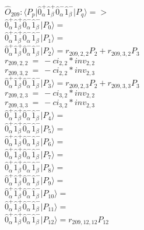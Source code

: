 \documentclass[14pt]{article}
\begin{document}
    $\hat{O}_{209}:  \langle{P_p}\vert \hat{0}_{\alpha}^{+}\hat{1}_{\beta}^{+}\hat{0}_{\alpha}^{-}\hat{1}_{\beta}^{-} \vert{P_q}\rangle => $ \\ 
    $ \hat{0}_{\alpha}^{+}\hat{1}_{\beta}^{+}\hat{0}_{\alpha}^{-}\hat{1}_{\beta}^{-} \vert{P_{0}}\rangle =  $ \\ 
    $ \hat{0}_{\alpha}^{+}\hat{1}_{\beta}^{+}\hat{0}_{\alpha}^{-}\hat{1}_{\beta}^{-} \vert{P_{1}}\rangle =  $ \\ 
    $ \hat{0}_{\alpha}^{+}\hat{1}_{\beta}^{+}\hat{0}_{\alpha}^{-}\hat{1}_{\beta}^{-} \vert{P_{2}}\rangle = {r}_{209,2,2}P_{2}+{r}_{209,3,2}P_{3} $ \\ 
    ${r}_{209,2,2}\ =\ -{ci}_{2,2}*{inv}_{2,2} $ \\ 
    ${r}_{209,3,2}\ =\ -{ci}_{2,2}*{inv}_{2,3} $ \\ 
    $ \hat{0}_{\alpha}^{+}\hat{1}_{\beta}^{+}\hat{0}_{\alpha}^{-}\hat{1}_{\beta}^{-} \vert{P_{3}}\rangle = {r}_{209,2,3}P_{2}+{r}_{209,3,3}P_{3} $ \\ 
    ${r}_{209,2,3}\ =\ -{ci}_{3,2}*{inv}_{2,2} $ \\ 
    ${r}_{209,3,3}\ =\ -{ci}_{3,2}*{inv}_{2,3} $ \\ 
    $ \hat{0}_{\alpha}^{+}\hat{1}_{\beta}^{+}\hat{0}_{\alpha}^{-}\hat{1}_{\beta}^{-} \vert{P_{4}}\rangle =  $ \\ 
    $ \hat{0}_{\alpha}^{+}\hat{1}_{\beta}^{+}\hat{0}_{\alpha}^{-}\hat{1}_{\beta}^{-} \vert{P_{5}}\rangle =  $ \\ 
    $ \hat{0}_{\alpha}^{+}\hat{1}_{\beta}^{+}\hat{0}_{\alpha}^{-}\hat{1}_{\beta}^{-} \vert{P_{6}}\rangle =  $ \\ 
    $ \hat{0}_{\alpha}^{+}\hat{1}_{\beta}^{+}\hat{0}_{\alpha}^{-}\hat{1}_{\beta}^{-} \vert{P_{7}}\rangle =  $ \\ 
    $ \hat{0}_{\alpha}^{+}\hat{1}_{\beta}^{+}\hat{0}_{\alpha}^{-}\hat{1}_{\beta}^{-} \vert{P_{8}}\rangle =  $ \\ 
    $ \hat{0}_{\alpha}^{+}\hat{1}_{\beta}^{+}\hat{0}_{\alpha}^{-}\hat{1}_{\beta}^{-} \vert{P_{9}}\rangle =  $ \\ 
    $ \hat{0}_{\alpha}^{+}\hat{1}_{\beta}^{+}\hat{0}_{\alpha}^{-}\hat{1}_{\beta}^{-} \vert{P_{10}}\rangle =  $ \\ 
    $ \hat{0}_{\alpha}^{+}\hat{1}_{\beta}^{+}\hat{0}_{\alpha}^{-}\hat{1}_{\beta}^{-} \vert{P_{11}}\rangle =  $ \\ 
    $ \hat{0}_{\alpha}^{+}\hat{1}_{\beta}^{+}\hat{0}_{\alpha}^{-}\hat{1}_{\beta}^{-} \vert{P_{12}}\rangle = {r}_{209,12,12}P_{12} $ \\ 
\end{document}
